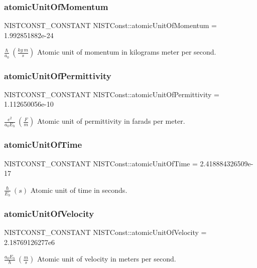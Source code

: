 \subsubsection{\texorpdfstring{atomic\+Unit\+Of\+Momentum}{atomicUnitOfMomentum}}
{\footnotesize\ttfamily N\+I\+S\+T\+C\+O\+N\+S\+T\+\_\+\+C\+O\+N\+S\+T\+A\+NT N\+I\+S\+T\+Const\+::atomic\+Unit\+Of\+Momentum = 1.\+992851882e-\/24}

$\frac{\hbar}{a_0} \ (\frac{kg\ m}{s})$ Atomic unit of momentum in kilograms meter per second. \mbox{\label{group___n_i_s_t_const-_atomic_unit_ga150ae2f35ef916113c6bcf612b7fa8c8}} 
\subsubsection{\texorpdfstring{atomic\+Unit\+Of\+Permittivity}{atomicUnitOfPermittivity}}
{\footnotesize\ttfamily N\+I\+S\+T\+C\+O\+N\+S\+T\+\_\+\+C\+O\+N\+S\+T\+A\+NT N\+I\+S\+T\+Const\+::atomic\+Unit\+Of\+Permittivity = 1.\+112650056e-\/10}

$\frac{e^2}{a_0 E_h} \ (\frac{F}{m})$ Atomic unit of permittivity in farads per meter. \mbox{\label{group___n_i_s_t_const-_atomic_unit_ga1dd9cd3a8f95c754529e663dc03d7b9e}} 
\subsubsection{\texorpdfstring{atomic\+Unit\+Of\+Time}{atomicUnitOfTime}}
{\footnotesize\ttfamily N\+I\+S\+T\+C\+O\+N\+S\+T\+\_\+\+C\+O\+N\+S\+T\+A\+NT N\+I\+S\+T\+Const\+::atomic\+Unit\+Of\+Time = 2.\+418884326509e-\/17}

$\frac{\hbar}{E_h} \ (s)$ Atomic unit of time in seconds. \mbox{\label{group___n_i_s_t_const-_atomic_unit_gaf53a1d1a7382eb03e12e980aeb34ded4}} 
\subsubsection{\texorpdfstring{atomic\+Unit\+Of\+Velocity}{atomicUnitOfVelocity}}
{\footnotesize\ttfamily N\+I\+S\+T\+C\+O\+N\+S\+T\+\_\+\+C\+O\+N\+S\+T\+A\+NT N\+I\+S\+T\+Const\+::atomic\+Unit\+Of\+Velocity = 2.\+18769126277e6}

$\frac{a_0 E_h}{\hbar} \ (\frac{m}{s})$ Atomic unit of velocity in meters per second. 